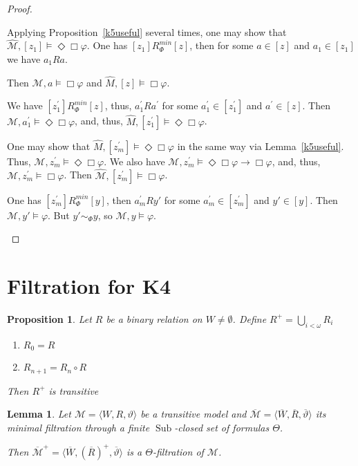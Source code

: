 \documentclass[a4paper]{article}
\theoremstyle{defin}
\theoremstyle{theorem}
\theoremstyle{prop}
\newtheorem{prop}{Proposition}
\theoremstyle{lemma}
\newtheorem{lemma}{Lemma}
\theoremstyle{ex}
\theoremstyle{col}
\begin{document}
\begin{proof}
\begin{enumerate}
  Applying Proposition~\ref{k5useful} several times, one may show that $\widehat{\mathcal{M}}, [z_1] \models \Diamond \Box \varphi$.
  One has $[z_1] R^{min}_{\Phi} [z]$, then for some $a \in [z]$ and $a_1 \in [z_1]$ we have $a_1 R a$.

  Then $\mathcal{M}, a \models \Box \varphi$ and $\widehat{M}, [z] \models \Box \varphi$.

  We have $[z_1^{'}] R^{min}_{\Phi} [z]$, thus, $a_1^{'} R a^{'}$ for some $a_1^{'} \in [z_1^{'}]$ and $a^{'} \in [z]$. Then
  $\mathcal{M}, a_1^{'} \models \Diamond \Box \varphi$, and, thus, $\widehat{M}, [z_1^{'}] \models \Diamond \Box \varphi$.

  One may show that $\widehat{M}, [z_{m}^{'}] \models \Diamond \Box \varphi$ in the same way via Lemma~\ref{k5useful}. Thus, $\mathcal{M}, z_{m}^{'} \models \Diamond \Box \varphi$. We also have $\mathcal{M}, z_{m}^{'} \models \Diamond \Box \varphi \to \Box \varphi$, and, thus,
  $\mathcal{M}, z_{m}^{'} \models \Box \varphi$. Then $\widehat{\mathcal{M}}, [z_m^{'}] \models \Box \varphi$.

  One has $[z_m^{'}] R^{min}_{\Phi} [y]$, then $a_m^{'} R y'$ for some $a_m^{'} \in [z_m^{'}]$ and $y' \in [y]$. Then $\mathcal{M}, y' \models \varphi$. But $y' \sim_{\Phi} y$, so $\mathcal{M}, y \models \varphi$.
  \end{enumerate}
\end{proof}


\section{Filtration for {\bf K4}}

\begin{prop}
  Let $R$ be a binary relation on $W \neq \emptyset$. Define $R^{+} = \bigcup \limits_{i < \omega} R_i$
  \begin{enumerate}
    \item $R_0 = R$
    \item $R_{n + 1} = R_n \circ R$
  \end{enumerate}
  Then $R^{+}$ is transitive
\end{prop}

\begin{lemma}
  Let $\mathcal{M} = \langle W, R, \vartheta \rangle$ be a transitive model and $\overline{\mathcal{M}} = \langle \overline{W}, \overline{R}, \overline{\vartheta} \rangle$ its minimal filtration through a finite $\operatorname{Sub}$-closed set of formulas $\Theta$.

  Then $\overline{\mathcal{M}}^{+} = \langle \overline{W}, (\overline{R})^{+}, \overline{\vartheta} \rangle$ is a $\Theta$-filtration of $\mathcal{M}$.
\end{lemma}
\end{document}

